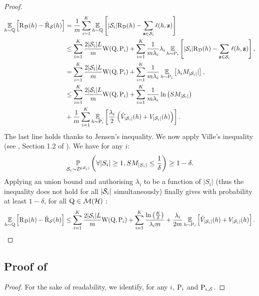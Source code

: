\begin{noaddcontents}
\begin{proof}
        \begin{align*}
            \EE_{h\sim\Q}\Big[ \Risk_{\D}(h) - \Riskhat_{\S}(h) \Big] &=  \frac{1}{m}\sum_{i=1}^{K} \EE_{h\sim\Q}\LB |\S_i|\Risk_{\D}(h) - \sum_{\z\in\S_i}\loss(h, \z) \RB\nonumber\\
            &\le \sum_{i=1}^{K} \frac{2|\S_i|L}{m}\W(\Q, \P_i) + \sum_{i=1}^{K} \frac{1}{m\lambda_i}\lambda_i\EE_{h\sim\P_i} \LB |\S_i|\Risk_{\D}(h) - \sum_{\z\in\S_i} \loss(h, \z) \RB, \\
            & = \sum_{i=1}^{K} \frac{2|\S_i|L}{m}\W(\Q, \P_i) + \sum_{i=1}^{K} \frac{1}{m\lambda_i}\EE_{h\sim\P_i} \LB \lambda_i M_{|\S_i|}| \RB, \\
            &\le   \sum_{i=1}^{K} \frac{2|\S_i|L}{m}\W(\Q, \P_i) + \sum_{i=1}^{K} \frac{1}{m\lambda_i} \ln\left( SM_{|\S_i|}  \right) \\
            & + \frac{1}{m}\sum_{i=1}^K \EE_{h\sim\P_i}\LB\frac{\lambda_i}{2}\left( \Vhat_{|\S_i|}(h) + V_{|\S_i|}(h) \right) \RB.
        \end{align*}
        The last line holds thanks to Jensen's inequality.
        We now apply Ville's inequality (see \eg, Section 1.2 of \cite{haddouche2023pac}).
        We have for any $i$: 
        \begin{align*}
        \PP_{\S_i \sim \D^{|\S_i|}}\left( \forall |S_i|\geq 1, SM_{|S_i|} \leq \frac{1}{\delta}  \right) \geq 1-\delta.
        \end{align*}
        Applying an union bound and authorising $\lambda_i$ to be a function of $|S_i|$ (thus the inequality does not hold for all $|\S_i|$ simultaneously) finally gives with probability at least $1-\delta$, for all $\Q\in \Mcal(\H)$ :
        \begin{multline*}
             \EE_{h\sim\Q}\Big[ \Risk_{\D}(h) - \Riskhat_{\S}(h) \Big] \leq    \sum_{i=1}^{K} \frac{2|\S_i|L}{m}\W(\Q, \P_i) + \sum_{i=1}^{K}   \frac{\ln\left( \frac{K}{\delta}  \right)}{\lambda_i m} + \frac{\lambda_i}{2m}\EE_{h\sim\P_i}\LB \Vhat_{|\S_i|}(h) + V_{|\S_i|}(h) \RB.
        \end{multline*}    
    \end{proof}
    
    \subsection{Proof of }
    \label{sec:proof-supervised}
    
    \theoremsupervisednnl*
    \begin{proof}
    For the sake of readability, we identify, for any $i$, $\P_i $ and $\P_{i,\S}$.

\end{proof}
\end{noaddcontents}
